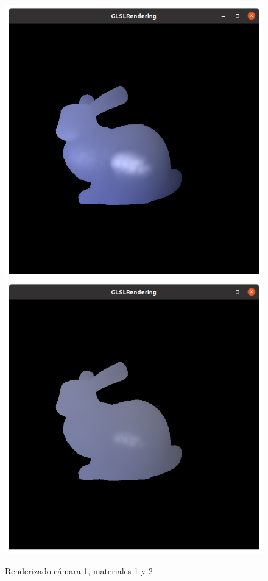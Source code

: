 \documentclass[12pt]{article}
\begin{document}
\begin{figure}[H]
\centering
\includegraphics[scale=0.3]{images/ej1.png}
\includegraphics[scale=0.3]{images/ej2.png}
\caption{Renderizado cámara 1, materiales 1 y 2}
\end{figure}
\end{document}
